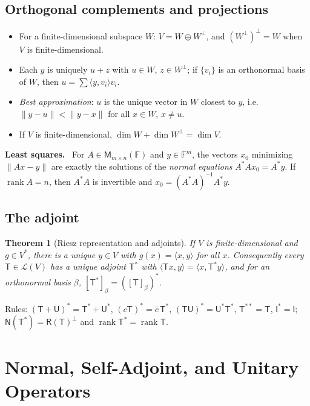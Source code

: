 \documentclass[12pt]{article}
\newtheorem{theorem}{Theorem}[section]
\theoremstyle{definition}
\theoremstyle{remark}
\newenvironment{fact}[1]{\par\noindent\textbf{#1.}\ }{\par}
\newcommand{\F}{\mathbb{F}}
\newcommand{\N}{\mathsf{N}}
\newcommand{\Rg}{\mathsf{R}}
\newcommand{\Lin}{\mathcal{L}}
\newcommand{\M}{\mathsf{M}}
\newcommand{\T}{\mathsf{T}}
\newcommand{\U}{\mathsf{U}}
\newcommand{\I}{\mathsf{I}}
\newcommand{\ip}[2]{\langle #1,#2\rangle}
\newcommand{\norm}[1]{\lVert #1\rVert}
\DeclareMathOperator{\rank}{rank}
\begin{document}
\subsection{Orthogonal complements and projections}
\begin{itemize}
  \item For a finite-dimensional subspace $W$: $V=W\oplus W^\perp$, and $(W^\perp)^\perp=W$ when $V$ is finite-dimensional.
  \item Each $y$ is uniquely $u+z$ with $u\in W$, $z\in W^\perp$; if $\{v_i\}$ is an orthonormal basis of $W$, then $u=\sum\ip{y}{v_i}v_i$.
  \item \emph{Best approximation}: $u$ is the unique vector in $W$ closest to $y$, i.e.\ $\norm{y-u}<\norm{y-x}$ for all $x\in W$, $x\neq u$.
  \item If $V$ is finite-dimensional, $\dim W+\dim W^\perp=\dim V$.
\end{itemize}

\begin{fact}{Least squares}
For $A\in\M_{m\times n}(\F)$ and $y\in\F^m$, the vectors $x_0$ minimizing $\norm{Ax-y}$ are exactly the solutions of the
\emph{normal equations} $A^*Ax_0=A^*y$. If $\rank A=n$, then $A^*A$ is invertible and $x_0=(A^*A)^{-1}A^*y$.
\end{fact}

\subsection{The adjoint}
\begin{theorem}[Riesz representation and adjoints]
If $V$ is finite-dimensional and $g\in V^*$, there is a unique $y\in V$ with $g(x)=\ip{x}{y}$ for all $x$.
Consequently every $\T\in\Lin(V)$ has a unique \emph{adjoint} $\T^*$ with $\ip{\T x}{y}=\ip{x}{\T^*y}$, and for an
orthonormal basis $\beta$, $[\T^*]_\beta=([\T]_\beta)^*$.
\end{theorem}
Rules: $(\T+\U)^*=\T^*+\U^*$, $(c\T)^*=\bar c\,\T^*$, $(\T\U)^*=\U^*\T^*$, $\T^{**}=\T$, $\I^*=\I$;
$\N(\T^*)=\Rg(\T)^\perp$ and $\rank\T^*=\rank\T$.

\section{Normal, Self-Adjoint, and Unitary Operators}
\end{document}
